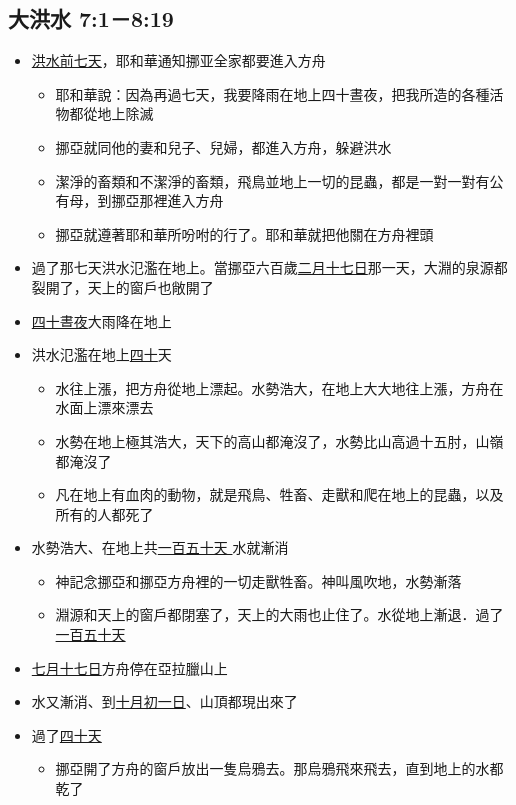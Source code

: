 \subsection{大洪水 7:1－8:19 }
\noindent
\begin{itemize} 
\itemsep-.35em 
\item \underline{洪水前七天}，耶和華通知挪亚全家都要進入方舟
\begin{itemize} 
\itemsep-.35em 
\item 耶和華說：因為再過七天，我要降雨在地上四十晝夜，把我所造的各種活物都從地上除滅
\item 挪亞就同他的妻和兒子、兒婦，都進入方舟，躲避洪水
\item 潔淨的畜類和不潔淨的畜類，飛鳥並地上一切的昆蟲，都是一對一對有公有母，到挪亞那裡進入方舟
\item 挪亞就遵著耶和華所吩咐的行了。耶和華就把他關在方舟裡頭
\end{itemize}
\item 過了那七天洪水氾濫在地上。當挪亞六百歲\underline{二月十七日}那一天，大淵的泉源都裂開了，天上的窗戶也敞開了
\item \underline{四十晝夜}大雨降在地上 
\item 洪水氾濫在地上\underline{四十}天
\begin{itemize} 
\itemsep-.35em 
\item 水往上漲，把方舟從地上漂起。水勢浩大，在地上大大地往上漲，方舟在水面上漂來漂去
\item 水勢在地上極其浩大，天下的高山都淹沒了，水勢比山高過十五肘，山嶺都淹沒了
\item 凡在地上有血肉的動物，就是飛鳥、牲畜、走獸和爬在地上的昆蟲，以及所有的人都死了
\end{itemize}
\item 水勢浩大、在地上共\underline{一百五十天 }水就漸消 
\begin{itemize} 
\itemsep-.35em 
\item 神記念挪亞和挪亞方舟裡的一切走獸牲畜。神叫風吹地，水勢漸落
\item 淵源和天上的窗戶都閉塞了，天上的大雨也止住了。水從地上漸退．過了\underline{一百五十天}
\end{itemize}
\item \underline{七月十七日}方舟停在亞拉臘山上 
\item 水又漸消、到\underline{十月初一日}、山頂都現出來了 
\item 過了\underline{四十天}
\begin{itemize} 
\itemsep-.35em 
\item 挪亞開了方舟的窗戶放出一隻烏鴉去。那烏鴉飛來飛去，直到地上的水都乾了

\end{itemize}
\end{itemize}
